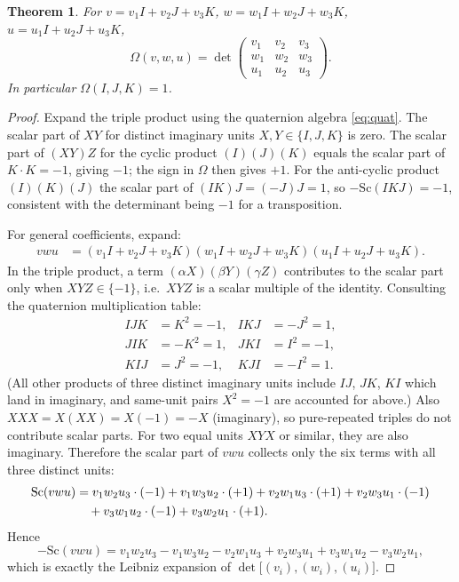 \documentclass[12pt,a4paper]{article}
\newtheorem{theorem}{Theorem}[section]
\theoremstyle{definition}
\theoremstyle{remark}
\begin{document}
\begin{theorem}\label{thm:Omega}
For $v=v_1 I+v_2 J+v_3 K$, $w=w_1 I+w_2 J+w_3 K$, $u=u_1 I+u_2 J+u_3 K$,
\begin{equation}\label{eq:Omega_det}
  \Omega(v,w,u)
  = \det\begin{pmatrix} v_1 & v_2 & v_3 \\ w_1 & w_2 & w_3 \\ u_1 & u_2 & u_3 \end{pmatrix}.
\end{equation}
In particular $\Omega(I,J,K)=1$.
\end{theorem}

\begin{proof}
Expand the triple product using the quaternion algebra \eqref{eq:quat}.
The scalar part of $XY$ for distinct imaginary units $X,Y\in\{I,J,K\}$ is zero.
The scalar part of $(XY)Z$ for the cyclic product $(I)(J)(K)$ equals the scalar
part of $K\cdot K = -1$, giving $-1$; the sign in $\Omega$ then gives $+1$.
For the anti-cyclic product $(I)(K)(J)$ the scalar part of $(IK)J=(-J)J=1$, so
$-\mathrm{Sc}(IKJ)=-1$, consistent with the determinant being $-1$ for a transposition.

For general coefficients, expand:
\begin{align}
  vwu &= (v_1 I + v_2 J + v_3 K)(w_1 I + w_2 J + w_3 K)(u_1 I + u_2 J + u_3 K).
\end{align}
In the triple product, a term $(\alpha X)(\beta Y)(\gamma Z)$ contributes to the
scalar part only when $XYZ\in\{-1\}$, i.e.\ $XYZ$ is a scalar multiple of the
identity.  Consulting the quaternion multiplication table:
\begin{align*}
  IJK &= K^2 = -1,       & IKJ &= -J^2 = 1, \\
  JIK &= -K^2 = 1,       & JKI &= I^2  = -1, \\
  KIJ &= J^2  = -1,      & KJI &= -I^2 = 1.
\end{align*}
(All other products of three distinct imaginary units include $IJ$, $JK$, $KI$
which land in imaginary, and same-unit pairs $X^2=-1$ are accounted for above.)
Also $XXX = X(XX) = X(-1) = -X$ (imaginary), so pure-repeated triples do not
contribute scalar parts.  For two equal units $XYX$ or similar, they are also
imaginary.  Therefore the scalar part of $vwu$ collects only the six terms with
all three distinct units:
\begin{align}
  \mathrm{Sc}(vwu) &= v_1 w_2 u_3 \cdot(-1) + v_1 w_3 u_2\cdot(+1)
                  + v_2 w_1 u_3\cdot(+1) + v_2 w_3 u_1\cdot(-1) \notag\\
                 &\quad + v_3 w_1 u_2\cdot(-1) + v_3 w_2 u_1\cdot(+1).
\end{align}
Hence
\begin{equation}
  -\mathrm{Sc}(vwu) = v_1 w_2 u_3 - v_1 w_3 u_2 - v_2 w_1 u_3 + v_2 w_3 u_1
                     + v_3 w_1 u_2 - v_3 w_2 u_1,
\end{equation}
which is exactly the Leibniz expansion of
$\det\bigl[(v_i),(w_i),(u_i)\bigr]$.
\end{proof}
\end{document}
